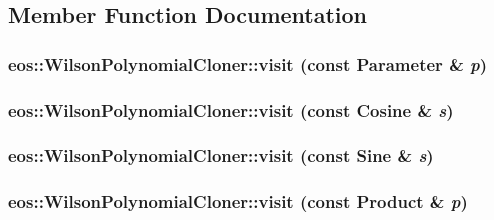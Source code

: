 \subsection{Member Function Documentation}
\hypertarget{classeos_1_1WilsonPolynomialCloner_adb3fc646a9af1e6ed77846378cce5843}{
\subsubsection[{visit}]{ eos::WilsonPolynomialCloner::visit (const {\bf Parameter} \& {\em p})}}
\label{classeos_1_1WilsonPolynomialCloner_adb3fc646a9af1e6ed77846378cce5843}
\hypertarget{classeos_1_1WilsonPolynomialCloner_aab4e3ed7514915cd2957dfe5b7b71cc1}{
\subsubsection[{visit}]{ eos::WilsonPolynomialCloner::visit (const Cosine \& {\em s})}}
\label{classeos_1_1WilsonPolynomialCloner_aab4e3ed7514915cd2957dfe5b7b71cc1}
\hypertarget{classeos_1_1WilsonPolynomialCloner_a6ee57d202b84e984bc7cefcfe9934382}{
\subsubsection[{visit}]{ eos::WilsonPolynomialCloner::visit (const Sine \& {\em s})}}
\label{classeos_1_1WilsonPolynomialCloner_a6ee57d202b84e984bc7cefcfe9934382}
\hypertarget{classeos_1_1WilsonPolynomialCloner_a8bc46349f3e4d3329ab1cec99c4772a6}{
\subsubsection[{visit}]{ eos::WilsonPolynomialCloner::visit (const Product \& {\em p})}}

